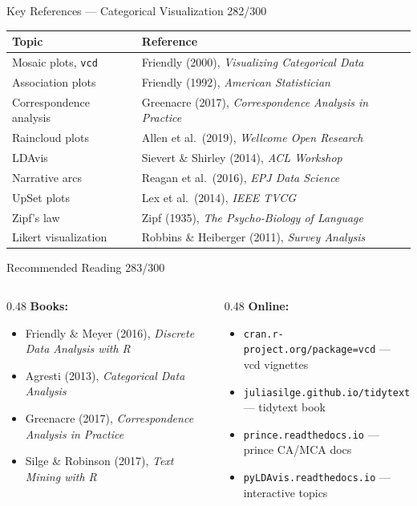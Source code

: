 \documentclass[10pt]{beamer}
\newcommand{\smark}[1]{\hfill{\scriptsize\color{codegray}#1}}
\begin{document}
\begin{frame}{Key References --- Categorical Visualization}
\smark{282/300}
\centering\scriptsize
\begin{tabular}{@{}ll@{}}
    \toprule
    \textbf{Topic} & \textbf{Reference} \\
    \midrule
    Mosaic plots, \texttt{vcd}    & Friendly (2000), \textit{Visualizing Categorical Data} \\
    Association plots              & Friendly (1992), \textit{American Statistician} \\
    Correspondence analysis        & Greenacre (2017), \textit{Correspondence Analysis in Practice} \\
    Raincloud plots                & Allen et al.\ (2019), \textit{Wellcome Open Research} \\
    LDAvis                         & Sievert \& Shirley (2014), \textit{ACL Workshop} \\
    Narrative arcs                 & Reagan et al.\ (2016), \textit{EPJ Data Science} \\
    UpSet plots                    & Lex et al.\ (2014), \textit{IEEE TVCG} \\
    Zipf's law                     & Zipf (1935), \textit{The Psycho-Biology of Language} \\
    Likert visualization           & Robbins \& Heiberger (2011), \textit{Survey Analysis} \\
    \bottomrule
\end{tabular}
\end{frame}

\begin{frame}{Recommended Reading}
\smark{283/300}
\begin{columns}[T]
\begin{column}{0.48\textwidth}
    \textbf{Books:}
    \begin{itemize}
        \item Friendly \& Meyer (2016), \textit{Discrete Data Analysis with R}
        \item Agresti (2013), \textit{Categorical Data Analysis}
        \item Greenacre (2017), \textit{Correspondence Analysis in Practice}
        \item Silge \& Robinson (2017), \textit{Text Mining with R}
    \end{itemize}
\end{column}
\begin{column}{0.48\textwidth}
    \textbf{Online:}
    \begin{itemize}
        \item \texttt{cran.r-project.org/package=vcd} --- vcd vignettes
        \item \texttt{juliasilge.github.io/tidytext} --- tidytext book
        \item \texttt{prince.readthedocs.io} --- prince CA/MCA docs
        \item \texttt{pyLDAvis.readthedocs.io} --- interactive topics
    \end{itemize}
\end{column}
\end{columns}
\end{frame}
\end{document}
